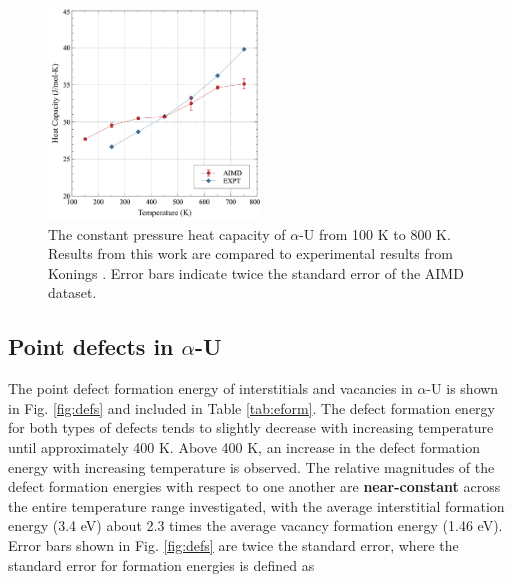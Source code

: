 \documentclass[utf8]{frontiersSCNS} %
\providecommand{\DIFaddtex}[1]{{\bf #1}} %
\providecommand{\DIFdeltex}[1]{} %
\providecommand{\DIFaddbegin}{\protect\color{blue}} %
\providecommand{\DIFaddend}{\protect\color{black}} %
\providecommand{\DIFdelbegin}{\protect\color{red}} %
\providecommand{\DIFdelend}{\protect\color{black}} %
\providecommand{\DIFadd}[1]{\texorpdfstring{\DIFaddtex{#1}}{#1}} %
\providecommand{\DIFdel}[1]{\texorpdfstring{\DIFdeltex{#1}}{}} %
\begin{document}
 \begin{figure}[hbt]
	\centering
	\includegraphics[width=0.5\textwidth]{cp.jpg}
  \caption{The constant pressure heat capacity of $\alpha$-U from 100 K to 800 K. Results from this work are compared to experimental results from Konings \cite{konings2010}. Error bars indicate twice the standard error of the AIMD dataset.}\label{fig:cp}
\end{figure}

\FloatBarrier

\subsection{Point defects in $\alpha$-U}

The point defect formation energy of interstitials and vacancies in $\alpha$-U is shown in Fig. \ref{fig:defs} and included in Table \ref{tab:eform}. The defect formation energy for both types of defects tends to slightly decrease with increasing temperature until approximately 400 K. Above 400 K, an increase in the defect formation energy with increasing temperature is observed. The relative magnitudes of the defect formation energies with respect to one another are \DIFdelbegin \DIFdel{near constant }\DIFdelend \DIFaddbegin \DIFadd{near-constant }\DIFaddend across the entire temperature range investigated, with the average interstitial formation energy (3.4 eV) about 2.3 times the average vacancy formation energy (1.46 eV). Error bars shown in Fig. \ref{fig:defs} are twice the standard error, where the standard error for formation energies is defined as 
\end{document}
